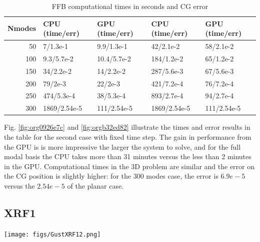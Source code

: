\documentclass[11pt]{article}
\begin{document}
\begin{table}[htbp]
\caption{\label{tab:org4cbfac3}FFB computational times in seconds and CG error}
\centering
\begin{tabular}{rllll}
Nmodes & CPU (time/err) & GPU (time/err) & CPU (time/err) & GPU (time/err)\\[0pt]
\hline
50 & 7/1.3e-1 & 9.9/1.3e-1 & 42/2.1e-2 & 58/2.1e-2\\[0pt]
100 & 9.3/5.7e-2 & 10.4/5.7e-2 & 184/1.2e-2 & 65/1.2e-2\\[0pt]
150 & 34/2.2e-2 & 14/2.2e-2 & 287/5.6e-3 & 67/5.6e-3\\[0pt]
200 & 79/2e-3 & 22/2e-3 & 421/7.2e-4 & 76/7.2e-4\\[0pt]
250 & 474/5.3e-4 & 38/5.3e-4 & 893/2.7e-4 & 94/2.7e-4\\[0pt]
300 & 1869/2.54e-5 & 111/2.54e-5 & 1869/2.54e-5 & 111/2.54e-5\\[0pt]
\hline
\end{tabular}
\end{table}

Fig. \ref{fig:org0926e7c} and \ref{fig:orgb32ed82} illustrate the times and error results in the table for the second case with fixed time step. The gain in performance from the GPU is is more impressive the larger the system to solve, and for the full modal basis the CPU takes more than 31 minutes versus the less than 2 minutes in the GPU. Computational times in the 3D problem are similar and the error on the CG position is slightly higher: for the 300 modes case, the error is \(6.9e-5\) versus the \(2.54e-5\) of the planar case.  

\url{}

\url{}

\url{}

\url{}


\subsection{XRF1}
\label{sec:org659a618}
\begin{center}
\texttt{[image: figs/GustXRF12.png]}
\end{center}
\end{document}
